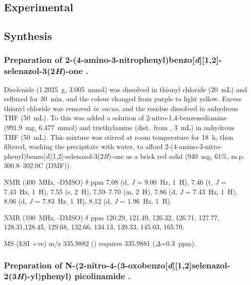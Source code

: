 \begin{refsection}
\section{Experimental}
\subsection{Synthesis}
\subsubsection[Preparation of \refcmpd{ebs-nitroaniline}]{Preparation of 2-(4-amino-3-nitrophenyl)benzo[\emph{d}][1,2]-selenazol-3(2\emph{H})-one .}

Diselenide  (1.2025~g, 3.005~mmol) was dissolved in thionyl chloride (20~mL) and refluxed for 30~min, and the colour changed from purple to light yellow.
Excess thionyl chloride was removed \emph{in vacuo}, and the residue dissolved in anhydrous THF (50~mL).
To this was added a solution of 2-nitro-1,4-benzenediamine (991.9~mg, 6.477~mmol) and triethylamine (dist.\ from , 3~mL) in anhydrous THF (50~mL).
This mixture was stirred at room temperature for 18~h, then filtered, washing the precipitate with water, to afford 2-(4-amino-3-nitro-phenyl)benzo[\emph{d}][1,2]-selenazol-3(2\emph{H})-one  as a brick red solid (940~mg, 61\%, m.p. 300.8--302.0\degree{}C (DMF)).

{\footnotesize

 NMR (400~MHz, -DMSO) $\delta$ ppm
7.08 (d, \emph{J} = 9.00~Hz, 1~H), 7.46 (t, \emph{J} = 7.43~Hz, 1~H), 7.55 (s, 2~H), 7.59--7.70 (m, 2~H), 7.86 (d, \emph{J} = 7.43~Hz, 1~H), 8.06 (d, \emph{J} = 7.83~Hz, 1~H), 8.12 (d, \emph{J} = 1.96~Hz, 1~H).

 NMR (100~MHz, -DMSO) $\delta$ ppm
120.29, 121.49, 126.32, 126.71, 127.77, 128.31,128.45, 129.68, 132.66, 134.13, 139.33, 145.03, 165.70.

MS (ESI +ve) m/z 335.9882 ()  requires 335.9881 ($\Delta$=0.3~ppm).
}

\subsubsection[Preparation of \refcmpd{ebs-nitroamide-2py}]{Preparation of N-(2-nitro-4-(3-oxobenzo[\emph{d}][1,2]selenazol-2(3\emph{H})-yl)\-phen\-yl) picolinamide .}


\end{refsection}
